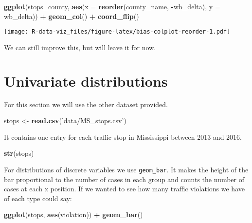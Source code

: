 \documentclass[]{book}
\newenvironment{Shaded}{\begin{snugshade}}{\end{snugshade}}
\newcommand{\DataTypeTok}[1]{\textcolor[rgb]{0.13,0.29,0.53}{#1}}
\newcommand{\KeywordTok}[1]{\textcolor[rgb]{0.13,0.29,0.53}{\textbf{#1}}}
\newcommand{\NormalTok}[1]{#1}
\newcommand{\OperatorTok}[1]{\textcolor[rgb]{0.81,0.36,0.00}{\textbf{#1}}}
\newcommand{\StringTok}[1]{\textcolor[rgb]{0.31,0.60,0.02}{#1}}
\begin{document}
\begin{Shaded}
\begin{Highlighting}[]
\KeywordTok{ggplot}\NormalTok{(stops_county, }\KeywordTok{aes}\NormalTok{(}\DataTypeTok{x =} \KeywordTok{reorder}\NormalTok{(county_name, }\OperatorTok{-}\NormalTok{wb_delta), }\DataTypeTok{y =}\NormalTok{ wb_delta)) }\OperatorTok{+}
\StringTok{  }\KeywordTok{geom_col}\NormalTok{() }\OperatorTok{+}\StringTok{ }
\StringTok{  }\KeywordTok{coord_flip}\NormalTok{()}
\end{Highlighting}
\end{Shaded}

\texttt{[image: R-data-viz\_files/figure-latex/bias-colplot-reorder-1.pdf]}

We can still improve this, but will leave it for now.

\hypertarget{univariate-distributions}{%
\section{Univariate distributions}\label{univariate-distributions}}

For this section we will use the other dataset provided.

\begin{Shaded}
\begin{Highlighting}[]
\NormalTok{stops <-}\StringTok{ }\KeywordTok{read.csv}\NormalTok{(}\StringTok{'data/MS_stops.csv'}\NormalTok{)}
\end{Highlighting}
\end{Shaded}

It contains one entry for each traffic stop in Mississippi between 2013 and 2016.

\begin{Shaded}
\begin{Highlighting}[]
\KeywordTok{str}\NormalTok{(stops)}
\end{Highlighting}
\end{Shaded}

For distributions of discrete variables we use \texttt{geom\_bar}. It makes the height of the bar proportional to the number of cases in each group and counts the number of cases at each x position.
If we wanted to see how many traffic violations we have of each type could say:

\begin{Shaded}
\begin{Highlighting}[]
\KeywordTok{ggplot}\NormalTok{(stops, }\KeywordTok{aes}\NormalTok{(violation)) }\OperatorTok{+}\StringTok{ }
\StringTok{  }\KeywordTok{geom_bar}\NormalTok{()}
\end{Highlighting}
\end{Shaded}
\end{document}
